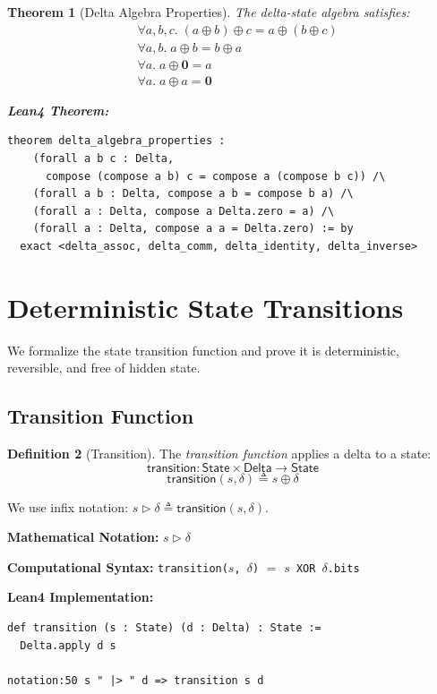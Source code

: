\documentclass[11pt,letterpaper]{article}
\theoremstyle{plain}
\newtheorem{theorem}{Theorem}[section]
\theoremstyle{definition}
\newtheorem{definition}[theorem]{Definition}
\theoremstyle{remark}
\newcommand{\dcompose}{\oplus}           %
\newcommand{\dzero}{\mathbf{0}}          %
\newcommand{\transition}{\triangleright} %
\newcommand{\StateType}{\mathsf{State}}
\newcommand{\DeltaType}{\mathsf{Delta}}
\begin{document}
\begin{theorem}[Delta Algebra Properties]
\label{thm:algebra-summary}
The delta-state algebra satisfies:
\begin{align}
&\forall a, b, c.\; (a \dcompose b) \dcompose c = a \dcompose (b \dcompose c) \tag{Associativity} \\
&\forall a, b.\; a \dcompose b = b \dcompose a \tag{Commutativity} \\
&\forall a.\; a \dcompose \dzero = a \tag{Identity} \\
&\forall a.\; a \dcompose a = \dzero \tag{Self-Inverse}
\end{align}

\medskip
\noindent\textbf{Lean4 Theorem:}
\begin{lstlisting}
theorem delta_algebra_properties :
    (forall a b c : Delta, 
      compose (compose a b) c = compose a (compose b c)) /\
    (forall a b : Delta, compose a b = compose b a) /\
    (forall a : Delta, compose a Delta.zero = a) /\
    (forall a : Delta, compose a a = Delta.zero) := by
  exact <delta_assoc, delta_comm, delta_identity, delta_inverse>
\end{lstlisting}
\end{theorem}

\section{Deterministic State Transitions}
\label{sec:transitions}

We formalize the state transition function and prove it is deterministic, reversible, and free of hidden state.

\subsection{Transition Function}

\begin{definition}[Transition]
\label{def:transition}
The \emph{transition function} applies a delta to a state:
\[
\mathsf{transition} : \StateType \times \DeltaType \to \StateType
\]
\[
\mathsf{transition}(s, \delta) \triangleq s \oplus \delta
\]

We use infix notation: $s \transition \delta \triangleq \mathsf{transition}(s, \delta)$.

\medskip
\noindent\textbf{Mathematical Notation:} $s \transition \delta$

\noindent\textbf{Computational Syntax:} \texttt{transition($s$, $\delta$)} $=$ \texttt{$s$ XOR $\delta$.bits}

\medskip
\noindent\textbf{Lean4 Implementation:}
\begin{lstlisting}
def transition (s : State) (d : Delta) : State := 
  Delta.apply d s

notation:50 s " |> " d => transition s d
\end{lstlisting}
\end{definition}
\end{document}
